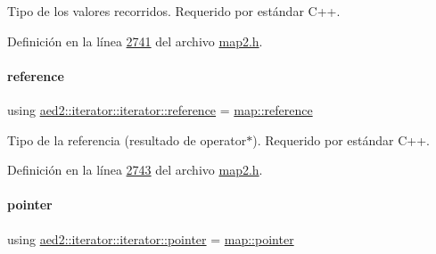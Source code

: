 Tipo de los valores recorridos. Requerido por estándar C++. 



Definición en la línea \hyperlink{map2_8h_source_l02741}{2741} del archivo \hyperlink{map2_8h_source}{map2.\+h}.

\mbox{\label{classaed2_1_1iterator_1_1iterator_a91be74b60dfc3eabfa5a69d9aa068959_a91be74b60dfc3eabfa5a69d9aa068959}} 
\paragraph{\texorpdfstring{reference}{reference}}
{\footnotesize\ttfamily using \hyperlink{classaed2_1_1iterator_1_1iterator_a91be74b60dfc3eabfa5a69d9aa068959_a91be74b60dfc3eabfa5a69d9aa068959}{aed2\+::iterator\+::iterator\+::reference} =  \hyperlink{classaed2_1_1map_af4f147533b3c0207ab036c86ce13ec0d_af4f147533b3c0207ab036c86ce13ec0d}{map\+::reference}}



Tipo de la referencia (resultado de operator$\ast$). Requerido por estándar C++. 



Definición en la línea \hyperlink{map2_8h_source_l02743}{2743} del archivo \hyperlink{map2_8h_source}{map2.\+h}.

\mbox{\label{classaed2_1_1iterator_1_1iterator_add8c8243f6b0e3cb7b67ce06757df53b_add8c8243f6b0e3cb7b67ce06757df53b}} 
\paragraph{\texorpdfstring{pointer}{pointer}}
{\footnotesize\ttfamily using \hyperlink{classaed2_1_1iterator_1_1iterator_add8c8243f6b0e3cb7b67ce06757df53b_add8c8243f6b0e3cb7b67ce06757df53b}{aed2\+::iterator\+::iterator\+::pointer} =  \hyperlink{classaed2_1_1map_a7394e98a23b86bc008ad73326b273fd5_a7394e98a23b86bc008ad73326b273fd5}{map\+::pointer}}



